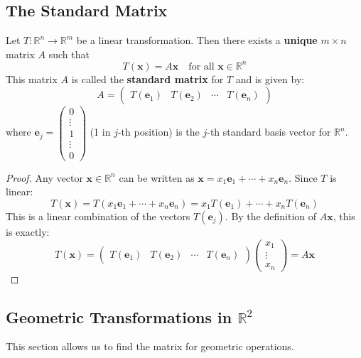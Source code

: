 \subsection{The Standard Matrix}
\begin{theorem}
Let $T: \mathbb{R}^n \to \mathbb{R}^m$ be a linear transformation. Then there exists a \textbf{unique} $m \times n$ matrix $A$ such that
\[ T(\mathbf{x}) = A\mathbf{x} \quad \text{for all } \mathbf{x} \in \mathbb{R}^n \]
This matrix $A$ is called the \textbf{standard matrix} for $T$ and is given by:
\[ A = \begin{pmatrix} T(\mathbf{e}_1) & T(\mathbf{e}_2) & \cdots & T(\mathbf{e}_n) \end{pmatrix} \]
where $\mathbf{e}_j = \begin{pmatrix} 0 \\ \vdots \\ 1 \\ \vdots \\ 0 \end{pmatrix}$ (1 in $j$-th position) is the $j$-th standard basis vector for $\mathbb{R}^n$.
\end{theorem}
\begin{proof}
Any vector $\mathbf{x} \in \mathbb{R}^n$ can be written as $\mathbf{x} = x_1\mathbf{e}_1 + \cdots + x_n\mathbf{e}_n$.
Since $T$ is linear:
\[ T(\mathbf{x}) = T(x_1\mathbf{e}_1 + \cdots + x_n\mathbf{e}_n) = x_1T(\mathbf{e}_1) + \cdots + x_nT(\mathbf{e}_n) \]
This is a linear combination of the vectors $T(\mathbf{e}_j)$.
By the definition of $A\mathbf{x}$, this is exactly:
\[ T(\mathbf{x}) = \begin{pmatrix} T(\mathbf{e}_1) & T(\mathbf{e}_2) & \cdots & T(\mathbf{e}_n) \end{pmatrix} \begin{pmatrix} x_1 \\ \vdots \\ x_n \end{pmatrix} = A\mathbf{x} \]
\end{proof}

\subsection{Geometric Transformations in $\mathbb{R}^2$}
This section allows us to find the matrix for geometric operations.

